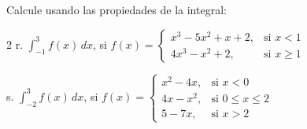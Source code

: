 \begin{ejer}{Calcule usando las propiedades de la integral:}
\begin{multicols}{2}
r. $\displaystyle\int_{-1}^{3}f(x)\,dx$, si $f(x)=
\begin{cases}
x^{3}-5x^{2}+x+2, & \text{si }x<1 \\ %
4x^{3}-x^{2}+2, & \text{si }x\geq 1
\end{cases}$


s. $\displaystyle\int_{-2}^{3}f(x)\,dx$, si $f(x)=
\begin{cases}
	x^{2}-4x, & \text{si }x<0 \\ %
	4x-x^{2}, & \text{si }0\leq x\leq 2 \\ %
	5-7x, & \text{si }x>2
\end{cases}$
\end{multicols}
\end{ejer}













